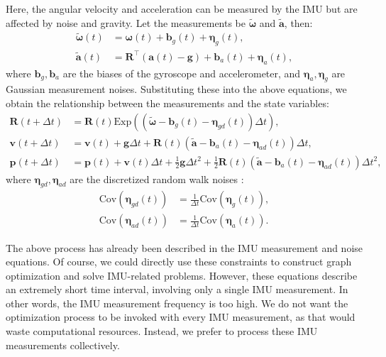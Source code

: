Here, the angular velocity and acceleration can be measured by the IMU but are affected by noise and gravity. Let the measurements be $\tilde{\boldsymbol{\omega}}$ and $\tilde{\bm{a}}$, then:
\begin{subequations}\label{key}
	\begin{align}
		\tilde{\boldsymbol{\omega}}(t) &= \boldsymbol{\omega}(t) + \bm{b}_g (t) + \boldsymbol{\eta}_g 
		(t), \\
		\tilde{\bm{a}}(t) &= \bm{R}^\top (\bm{a}(t) - \bm{g}) + \bm{b}_a (t) + \boldsymbol{\eta}_a 
		(t),
	\end{align}
\end{subequations}
where $\bm{b}_g, \bm{b}_a$ are the biases of the gyroscope and accelerometer, and $\boldsymbol{\eta}_a, \boldsymbol{\eta}_g$ are Gaussian measurement noises. Substituting these into the above equations, we obtain the relationship between the measurements and the state variables:
\begin{subequations}\label{eq:kinematics-delta-t}
	\begin{align}
		\bm{R}(t+\Delta t) &= \bm{R}(t) \mathrm{Exp} \left((\tilde{\boldsymbol{\omega}} - \bm{b}_g(t) - 
		\boldsymbol{\eta}_{gd} (t))\Delta t \right), \\
		\bm{v}(t+\Delta t) &= \bm{v}(t) + \bm{g} \Delta t + \bm{R}(t) (\tilde{\bm{a}} -\bm{b}_a(t) - 
		\boldsymbol{\eta}_{ad}(t)) \Delta t, \\
		\bm{p}(t+\Delta t) &= \bm{p}(t) + \bm{v}(t) \Delta t + \frac{1}{2}\bm{g} \Delta t^2 + \frac{1}{2} 
		\bm{R}(t) (\tilde{\bm{a}} -\bm{b}_a(t) - \boldsymbol{\eta}_{ad}(t)) \Delta t^2 ,
	\end{align}
\end{subequations}
where $\boldsymbol{\eta}_{gd}, 
\boldsymbol{\eta}_{ad}$ are the discretized random walk noises \cite{Crassidis2006}:
\begin{subequations}\label{key}
	\begin{align}
		\mathrm{Cov}(\boldsymbol{\eta}_{gd}(t) ) &= \frac{1}{\Delta t} \mathrm{Cov} 
		(\boldsymbol{\eta}_g(t)), \\
		\mathrm{Cov}(\boldsymbol{\eta}_{ad}(t) ) &= \frac{1}{\Delta t} \mathrm{Cov} 
		(\boldsymbol{\eta}_a(t)).
	\end{align}
\end{subequations}

The above process has already been described in the IMU measurement and noise equations. Of course, we could directly use these constraints to construct graph optimization and solve IMU-related problems. However, these equations describe an extremely short time interval, involving only a single IMU measurement. In other words, the IMU measurement frequency is too high. We do not want the optimization process to be invoked with every IMU measurement, as that would waste computational resources. Instead, we prefer to process these IMU measurements collectively.

